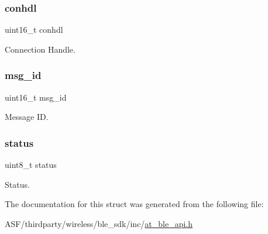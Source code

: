 \subsubsection{\texorpdfstring{conhdl}{conhdl}}
{\footnotesize\ttfamily uint16\+\_\+t conhdl}



Connection Handle. 

\mbox{\label{structat__ble__prf__server__error__ind__t_a689014fc11d4f26d264ddae2eaebc9d8}} 
\subsubsection{\texorpdfstring{msg\_id}{msg\_id}}
{\footnotesize\ttfamily uint16\+\_\+t msg\+\_\+id}



Message ID. 

\mbox{\label{structat__ble__prf__server__error__ind__t_ade818037fd6c985038ff29656089758d}} 
\subsubsection{\texorpdfstring{status}{status}}
{\footnotesize\ttfamily uint8\+\_\+t status}



Status. 



The documentation for this struct was generated from the following file\+:\begin{DoxyCompactItemize}
\item 
A\+S\+F/thirdparty/wireless/ble\+\_\+sdk/inc/\mbox{\hyperlink{at__ble__api_8h}{at\+\_\+ble\+\_\+api.\+h}}\end{DoxyCompactItemize}
